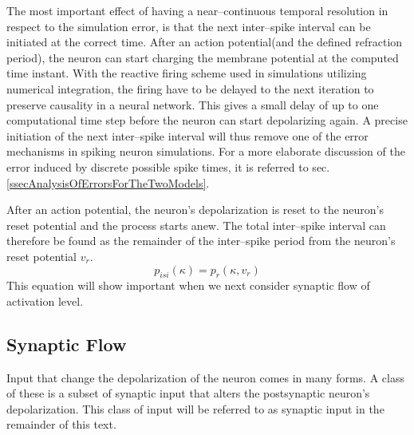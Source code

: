 	The most important effect of having a near--continuous temporal resolution in respect to the simulation error, is that the next inter--spike interval can be initiated at the correct time. %
	After an action potential(and the defined refraction period), the neuron can start charging the membrane potential at the computed time instant. %
	With the reactive firing scheme used in simulations utilizing numerical integration, the firing have to be delayed to the next iteration to preserve causality in a neural network. %
	This gives a small delay of up to one computational time step before the neuron can start depolarizing again.
	A precise initiation of the next inter--spike interval will thus remove one of the error mechanisms in spiking neuron simulations.
	For a more elaborate discussion of the error induced by discrete possible spike times, it is referred to sec. \ref{ssecAnalysisOfErrorsForTheTwoModels}.

	After an action potential, the neuron's depolarization is reset to the neuron's reset potential and the process starts anew.
	The total inter--spike interval can therefore be found as the remainder of the inter--spike period from the neuron's reset potential $v_r$.
\begin{equation}
	p_{isi}(\kappa) = p_r(\kappa, v_r)%
	\label{eqEstimateOfInterSpikePeriod}
\end{equation}
	This equation will show important when we next consider synaptic flow of activation level.
	


    \subsection{Synaptic Flow}
	\label{ssecSynapticFlow}
	Input that change the depolarization of the neuron comes in many forms. 
	A class of these is a subset of synaptic input that alters the postsynaptic neuron's depolarization.
	This class of input will be referred to as synaptic input in the remainder of this text.

